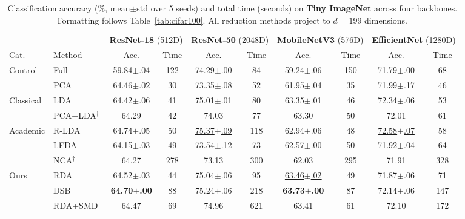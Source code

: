 \begin{table}[t]
\centering
\caption{Classification accuracy (\%, mean$\pm$std over 5 seeds) and total time (seconds) on \textbf{Tiny ImageNet} across four backbones. Formatting follows Table~\ref{tab:cifar100}. All reduction methods project to $d = 199$ dimensions.}
\label{tab:tinyimagenet}
\small
\begin{tabular}{@{}l l cc cc cc cc@{}}
\toprule
& & \multicolumn{2}{c}{\textbf{ResNet-18} (512D)} & \multicolumn{2}{c}{\textbf{ResNet-50} (2048D)} & \multicolumn{2}{c}{\textbf{MobileNetV3} (576D)} & \multicolumn{2}{c}{\textbf{EfficientNet} (1280D)} \\
\cmidrule(lr){3-4} \cmidrule(lr){5-6} \cmidrule(lr){7-8} \cmidrule(lr){9-10}
Cat. & Method & Acc. & Time & Acc. & Time & Acc. & Time & Acc. & Time \\
\midrule
\multirow{2}{*}{Control}
& Full       & 59.84{\tiny$\pm$.04} & 122  & 74.29{\tiny$\pm$.00} & 84   & 59.24{\tiny$\pm$.06} & 150  & 71.79{\tiny$\pm$.00} & 68  \\
& PCA        & 64.46{\tiny$\pm$.02} & 30   & 73.35{\tiny$\pm$.08} & 52   & 61.95{\tiny$\pm$.04} & 35   & 71.99{\tiny$\pm$.17} & 46  \\
\midrule
\multirow{2}{*}{Classical}
& LDA        & 64.42{\tiny$\pm$.06} & 41   & 75.01{\tiny$\pm$.01} & 80   & 63.35{\tiny$\pm$.01} & 46   & 72.34{\tiny$\pm$.06} & 53  \\
& PCA+LDA$^\dagger$    & 64.29 & 42   & 74.03 & 77   & 63.30 & 50   & 72.01 & 61  \\
\midrule
\multirow{3}{*}{Academic}
& R-LDA      & 64.74{\tiny$\pm$.05} & 50   & \underline{75.37{\tiny$\pm$.09}} & 118  & 62.94{\tiny$\pm$.06} & 48   & \underline{72.58{\tiny$\pm$.07}} & 58  \\
& LFDA       & 64.15{\tiny$\pm$.03} & 49   & 73.54{\tiny$\pm$.12} & 73   & 62.57{\tiny$\pm$.00} & 50   & 71.92{\tiny$\pm$.04} & 64  \\
& NCA$^\dagger$        & 64.27 & 278  & 73.13 & 300  & 62.03 & 295  & 71.91 & 328 \\
\midrule
\multirow{3}{*}{Ours}
& RDA        & 64.52{\tiny$\pm$.03} & 44   & 75.04{\tiny$\pm$.06} & 95   & \underline{63.46{\tiny$\pm$.02}} & 49   & 71.87{\tiny$\pm$.06} & 71  \\
& DSB        & \textbf{64.70{\tiny$\pm$.00}} & 88   & 75.24{\tiny$\pm$.06} & 218  & \textbf{63.73{\tiny$\pm$.00}} & 87   & 72.14{\tiny$\pm$.06} & 147 \\
& RDA+SMD$^\dagger$    & 64.47 & 69   & 74.96 & 621  & 63.41 & 61   & 72.10 & 172 \\
\bottomrule
\end{tabular}
\end{table}

